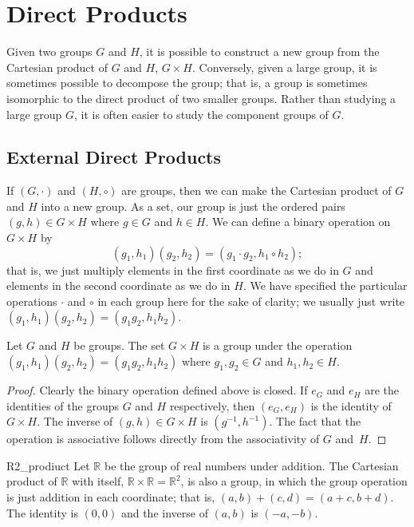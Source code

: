 \section{Direct Products}\label{isomorph_section_2}

Given two groups $G$ and $H$, it is possible to construct a new group from the Cartesian product of $G$ and $H$, $G \times H$.  Conversely, given a large group, it is sometimes possible to decompose the group; that is, a group is sometimes isomorphic to the direct product of two smaller groups.  Rather than studying a large group $G$, it is often easier to study the component groups of $G$. 
 
 
\subsection*{External Direct Products}

If $(G,\cdot)$ and $(H, \circ)$ are groups, then we can make the Cartesian product of $G$ and $H$ into a new group.  As a set, our group is just the ordered pairs $(g, h) \in G \times H$ where $g \in G$ and $h \in H$. We can define a binary operation on $G \times H$ by 
\[
(g_1, h_1)(g_2, h_2) = (g_1 \cdot g_2, h_1 \circ h_2);
\]
that is, we just multiply elements in the first coordinate as we do in $G$ and elements in the second coordinate as we do in $H$.  We have specified the particular operations $\cdot$ and $\circ$ in each group here for the sake of clarity; we usually just write $(g_1, h_1)(g_2, h_2) = (g_1  g_2, h_1 h_2)$.  

\begin{proposition}\label{isomorph_theorem_7}
Let $G$ and $H$ be groups. The set $G \times H$ is a group under the operation $(g_1, h_1)(g_2, h_2) = (g_1  g_2, h_1 h_2)$ where $g_1, g_2 \in G$ and $h_1, h_2 \in H$. 
\end{proposition}

\begin{proof}
Clearly the binary operation defined above is closed. If $e_G$ and $e_H$ are the identities of the groups $G$ and $H$ respectively, then $(e_G, e_H)$ is the identity of $G \times H$.  The inverse of $(g, h) \in G \times H$ is $(g^{-1}, h^{-1})$.  The fact that the operation is associative follows directly from the associativity of $G$ and~$H$.
\end{proof}

\begin{example}{R2_prodiuct}
Let ${\mathbb R}$ be the group of real numbers under addition.  The Cartesian product of ${\mathbb R}$ with itself, ${\mathbb R} \times {\mathbb R} = {\mathbb R}^2$, is also a group, in which the group operation is just addition in each coordinate; that is, $(a, b) + (c, d) = (a + c, b + d)$.  The identity is $(0,0)$ and the inverse of $(a, b)$ is $(-a, -b)$.
\end{example}

